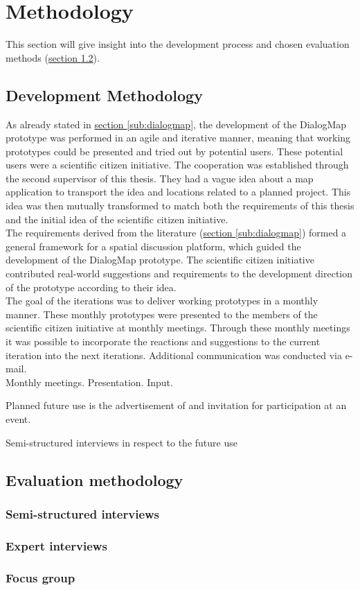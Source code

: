 \section{Methodology}
\label{chap:methodology}
This section will give insight into the development process and chosen evaluation methods (\hyperref[subchap:ev_methodology]{section \ref{subchap:ev_methodology}}).


\subsection{Development Methodology}
As already stated in \hyperref[sub:dialogmap]{section \ref{sub:dialogmap}}, the development of the DialogMap prototype was performed in an agile and iterative manner, meaning that working prototypes could be presented and tried out by potential users. These potential users were a scientific citizen initiative. The cooperation was established through the second supervisor of this thesis. They had a vague idea about a map application to transport the idea and locations related to a planned project. This idea was then mutually transformed to match both the requirements of this thesis and the initial idea of the scientific citizen initiative.\\
The requirements derived from the literature (\hyperref[sub:dialogmap]{section \ref{sub:dialogmap}}) formed a general framework for a spatial discussion platform, which guided the development of the DialogMap prototype. The scientific citizen initiative contributed real-world suggestions and requirements to the development direction of the prototype according to their idea.\\
The goal of the iterations was to deliver working prototypes in a monthly manner. These monthly prototypes were presented to the members of the scientific citizen initiative at monthly meetings. Through these monthly meetings it was possible to incorporate the reactions and suggestions to the current iteration into the next iterations. Additional communication was conducted via e-mail.\\



Monthly meetings. Presentation. Input.

Planned future use is the advertisement of and invitation for participation at an event.

Semi-structured interviews in respect to the future use

\subsection{Evaluation methodology}
\label{subchap:ev_methodology}

\subsubsection{Semi-structured interviews}

\subsubsection{Expert interviews}

\subsubsection{Focus group}

